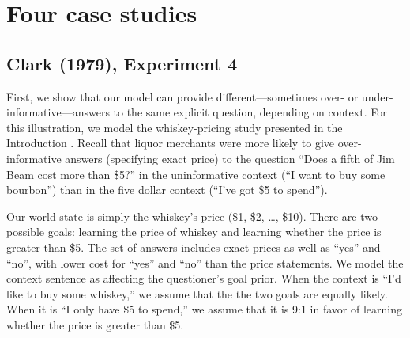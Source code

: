 \documentclass[12pt, floatsintext, jou]{apa6}
\begin{document}
\section{Four case studies}


\subsection{Clark (1979), Experiment 4}
First, we show that our model can provide different---sometimes over- or under-informative---answers to the same explicit question, depending on context. For this illustration, we model the whiskey-pricing study presented in the Introduction \cite{Clark79_IndirectSpeechActs}. Recall that liquor merchants were more likely to give over-informative answers (specifying exact price) to the question ``Does a fifth of Jim Beam cost more than \$5?'' in the uninformative context (``I want to buy some bourbon'') than in the five dollar context (``I've got \$5 to spend'').

Our world state is simply the whiskey's price (\$1, \$2, \dots, \$10). There are two possible goals: learning the price of whiskey and learning whether the price is greater than \$5.  The set of answers includes exact prices as well as ``yes'' and ``no'', with lower cost for ``yes'' and ``no'' than the price statements. We model the context sentence as affecting the questioner's goal prior. When the context is ``I'd like to buy some whiskey,'' we assume that the the two goals are equally likely. When it is ``I only have \$5 to spend,'' we assume that it is 9:1 in favor of learning whether the price is greater than \$5.
\end{document}
